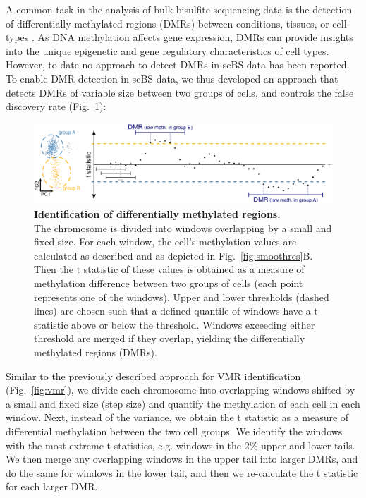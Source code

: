 \documentclass[twocolumn,10pt]{article}
\begin{document}
A common task in the analysis of bulk bisulfite-sequencing data is the detection of differentially methylated regions (DMRs) between conditions, tissues, or cell types \citep{Hebestreit2013, dmrseq}.
As DNA methylation affects gene expression, DMRs can provide insights into the unique epigenetic and gene regulatory characteristics of cell types.
However, to date no approach to detect DMRs in scBS data has been reported.
To enable DMR detection in scBS data, we thus developed an approach that detects DMRs of variable size between two groups of cells, and controls the false discovery rate (Fig.~\ref{fig:dmrscan}):

\begin{figure}
	\begin{center}
		\includegraphics[width=.75\textwidth]{figures/Fig_DMRdetection.png}
	\end{center}
	\caption{\small \textbf{Identification of differentially methylated regions.}\\
		The chromosome is divided into windows overlapping by a small and fixed size.
		For each window, the cell’s methylation values are calculated as described and as depicted in Fig.~\ref{fig:smoothres}B.
		Then the t statistic of these values is obtained as a measure of methylation difference between two groups of cells (each point represents one of the windows).
		Upper and lower thresholds (dashed lines) are chosen such that a defined quantile of windows have a t statistic above or below the threshold.
		Windows exceeding either threshold are merged if they overlap, yielding the differentially methylated regions (DMRs).}
	\label{fig:dmrscan}
\end{figure}

Similar to the previously described approach for VMR identification (Fig.~\ref{fig:vmr}), we divide each chromosome into overlapping windows shifted by a small and fixed size (step size) and quantify the methylation of each cell in each window.
Next, instead of the variance, we obtain the t statistic %
as a measure of differential methylation between the two cell groups.
We identify the windows with the most extreme t statistics, e.g. windows in the 2\% upper and lower tails.
We then merge any overlapping windows in the upper tail into larger DMRs, and do the same for windows in the lower tail, and then we re-calculate the t statistic for each larger DMR.
\end{document}
